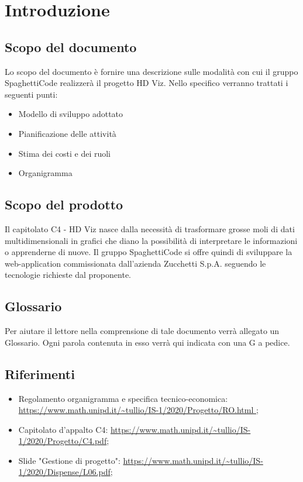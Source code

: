 \documentclass{article}
\begin{document}


\section{Introduzione}%
\label{sec:introduzione}

\subsection{Scopo del documento}%
\label{sub:scopo_del_documento}
Lo scopo del documento è fornire una descrizione sulle modalità con cui il gruppo SpaghettiCode realizzerà il progetto HD Viz. Nello specifico verranno trattati i seguenti punti:
\begin{itemize}
\item Modello di sviluppo adottato
\item Pianificazione delle attività
\item Stima dei costi e dei ruoli
\item Organigramma 
\end{itemize}

\subsection{Scopo del prodotto}%
\label{sub:scopo_prodotto}
Il capitolato C4 - HD Viz nasce dalla necessità di trasformare grosse moli di dati multidimensionali in grafici che diano la possibilità di interpretare le informazioni o apprenderne di nuove. Il gruppo SpaghettiCode si offre quindi di sviluppare la web-application commissionata dall’azienda Zucchetti S.p.A. seguendo le tecnologie richieste dal proponente. 


\subsection{Glossario}%
\label{sub:glossario}
Per aiutare il lettore nella comprensione di tale documento verrà allegato un Glossario. Ogni parola contenuta in esso verrà qui indicata con una G a pedice.


\subsection{Riferimenti}%
\label{sub:riferimenti}
\begin{itemize}
\item Regolamento organigramma e specifica tecnico-economica: \url{https://www.math.unipd.it/~tullio/IS-1/2020/Progetto/RO.html };
\item Capitolato d’appalto C4: \url{https://www.math.unipd.it/~tullio/IS-1/2020/Progetto/C4.pdf};
\item Slide "Gestione di progetto": \url{https://www.math.unipd.it/~tullio/IS-1/2020/Dispense/L06.pdf};
\end{itemize}
\end{document}
